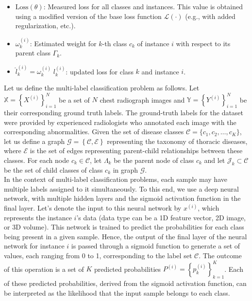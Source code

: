\begin{itemize}
    \item  $\text{Loss}(\theta) $: Measured loss for all classes and instances. This value is obtained using a modified version of the base loss function $\mathcal{L}(\cdot) $ (e.g., with added regularization, etc.).
    \item  $\omega_k^{(i)} $: Estimated weight for $k$-th class $c_k $ of instance $i $ with respect to its parent class $\Gamma_k $.
    \item  ${\widehat l}_k^{(i)} = \omega_k^{(i)} \; l_k^{(i)} $: updated loss for class $k $ and instance $i $.
\end{itemize}
Let us define the multi-label classification problem as follows. Let $\mathbb{X} = {\left\{X^{(i)}\right\}}_{i=1}^{N} $ be a set of $N $ chest radiograph images and $\mathbb{Y} = {\left\{Y^{(i)}\right\}}_{i=1}^{N} $ be their corresponding ground truth labels. The ground-truth labels for the dataset were provided by experienced radiologists who annotated each image with the corresponding abnormalities.
Given the set of disease classes $\mathcal{C} = \{c_1,c_2,\dots,c_K\} $, let us define a  graph $\mathcal{G}=\left\{\mathcal{C},\mathcal{E}\right\} $ representing the taxonomy of thoracic diseases, where $\mathcal{E}$ is the set of edges representing parent-child relationships between these classes. For each node $c_k \in \mathcal{C} $, let $\Lambda_k$ be the parent node of class $c_k $ and let $\mathcal{J}_k\subset \mathcal{C} $ be the set of child classes of class $c_k $ in graph $\mathcal{G}$. \\
In the context of multi-label classification problems, each sample may have multiple labels assigned to it simultaneously. To this end, we use a deep neural network, with multiple hidden layers and the sigmoid activation function in the final layer. Let's denote the input to this neural network by $x^{(i)}$, which represents the instance $i$'s data (data type can be a 1D feature vector, 2D image, or 3D volume). This network is trained to predict the probabilities for each class being present in a given sample. Hence, the output of the final layer of the neural network for instance $i$ is passed through a sigmoid function to generate a set of values, each ranging from 0 to 1, corresponding to the label set $\mathcal{C} $.
The outcome of this operation is a set of $K $ predicted probabilities $P^{(i)}={\left\{p_k^{(i)}\right\}}_{k=1}^{K} $. Each of these predicted probabilities, derived from the sigmoid activation function, can be interpreted as the likelihood that the input sample belongs to each class.
